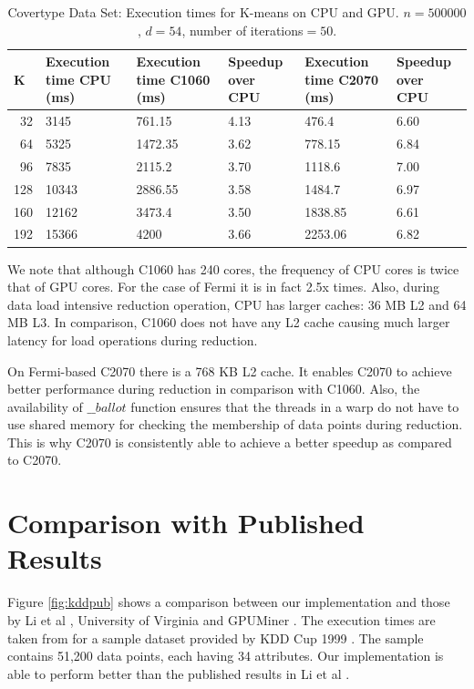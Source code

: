 \begin{table}[htbp]
\begin{center}
\begin{tabular}{|r|p{2.8cm}|p{2.8cm}|p{2cm}|p{2.8cm}|p{2cm}|}
\hline
\multicolumn{1}{|l|}{K} & \multicolumn{1}{p{2.8cm}|}{Execution time CPU (ms)} & \multicolumn{1}{p{2.8cm}|}{Execution time C1060 (ms)} & \multicolumn{1}{p{2cm}|}{Speedup over CPU} & Execution time C2070 (ms) & \multicolumn{1}{p{2cm}|}{Speedup over CPU} \\ \hline
32 & 3145 & 761.15 & 4.13 & 476.4 & 6.60 \\ \hline
64 & 5325 & 1472.35 & 3.62 & 778.15 & 6.84 \\ \hline
96 & 7835 & 2115.2 & 3.70 & 1118.6 & 7.00 \\ \hline
128 & 10343 & 2886.55 & 3.58 & 1484.7 & 6.97 \\ \hline
160 & 12162 & 3473.4 & 3.50 & 1838.85 & 6.61 \\ \hline
192 & 15366 & 4200 & 3.66 & 2253.06 & 6.82 \\ \hline
\end{tabular}
\end{center}
\caption{Covertype Data Set: Execution times for K-means on CPU and GPU. $n = 500000$, $d = 54$, number of iterations$ = 50$.}
\label{table:coverCPU2}
\end{table}

We note that although C1060 has 240 cores, the frequency of CPU cores is twice that of GPU cores. For the case of Fermi it is in fact 2.5x times. Also, during data load intensive reduction operation, CPU has larger caches: 36 MB L2 and 64 MB L3. In comparison, C1060 does not have any L2 cache causing much larger latency for load operations during reduction.


On Fermi-based C2070 there is a 768 KB L2 cache. It enables C2070 to achieve better performance during reduction in comparison with C1060. Also, the availability of $\_\_ballot$ function ensures that the threads in a warp do not have to use shared memory for checking the membership of data points during reduction. This is why C2070 is consistently able to achieve a better speedup as compared to C2070.


\section{Comparison with Published Results}

Figure \ref{fig:kddpub} shows a comparison between our implementation and those by Li et al \cite{li_et_al}, University of Virginia \cite{che_et_al} and GPUMiner \cite{gpuminer}. The execution times are taken from \cite{li_et_al} for a sample dataset provided by KDD Cup 1999 \cite{kdd}. The sample contains 51,200 data points, each having 34 attributes. Our implementation is able to perform better than the published results in Li et al \cite{li_et_al}.

